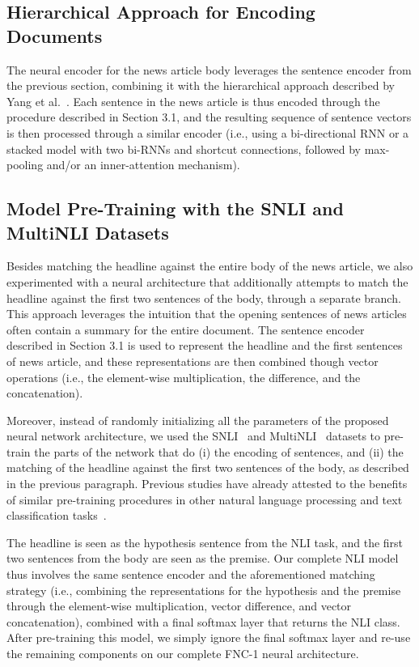 \subsection{Hierarchical Approach for Encoding Documents}

The neural encoder for the news article body leverages the sentence encoder from the previous section, combining it with the hierarchical approach described by Yang et al.~\cite{hierarchical}. Each sentence in the news article is thus encoded through the procedure described in Section 3.1, and the resulting sequence of sentence vectors is then processed through a similar encoder (i.e., using a bi-directional RNN or a stacked model with two bi-RNNs and shortcut connections, followed by max-pooling and/or an inner-attention mechanism).

\subsection{Model Pre-Training with the SNLI and MultiNLI Datasets}

Besides matching the headline against the entire body of the news article, we also experimented with a neural architecture that additionally attempts to match the headline against the first two sentences of the body, through a separate branch. This approach leverages the intuition that the opening sentences of news articles often contain a summary for the entire document. The sentence encoder described in Section 3.1 is used to represent the headline and the first sentences of news article, and these representations are then combined though vector operations (i.e., the element-wise multiplication, the difference, and the concatenation).

Moreover, instead of randomly initializing all the parameters of the proposed neural network architecture, we used the SNLI~\cite{snli} and MultiNLI~\cite{inference} datasets to pre-train the parts of the network that do (i) the encoding of sentences, and (ii) the matching of the headline against the first two sentences of the body, as described in the previous paragraph. Previous studies have already attested to the benefits of similar pre-training procedures in other natural language processing and text classification tasks~\cite{supervised}.

The headline is seen as the hypothesis sentence from the NLI task, and the first two sentences from the body are seen as the premise. Our complete NLI model thus involves the same  sentence encoder and the aforementioned matching strategy (i.e., combining the representations for the hypothesis and the premise through the element-wise multiplication, vector difference, and vector concatenation), combined with a final softmax layer that returns the NLI class. After pre-training this model, we simply ignore the final softmax layer and re-use the remaining components on our complete FNC-1 neural architecture.

